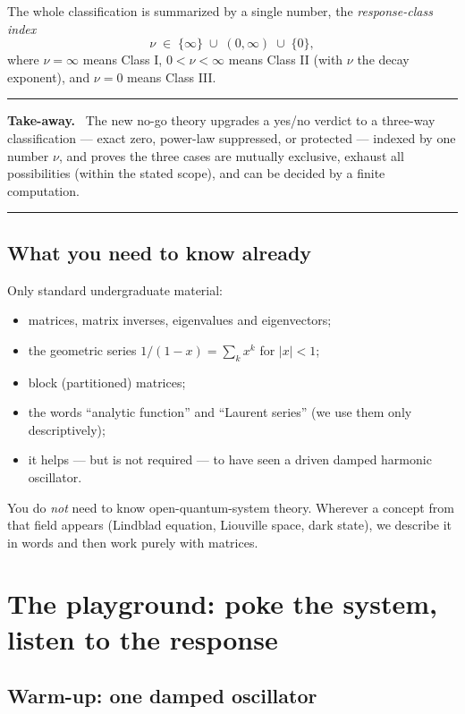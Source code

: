 \documentclass[11pt]{article}
\newenvironment{takeaway}
  {\par\medskip\noindent
   \begin{center}\begin{minipage}{0.92\textwidth}
   \hrule\medskip\noindent\textbf{Take-away.}\ }
  {\medskip\hrule\end{minipage}\end{center}\medskip}
\begin{document}
The whole classification is summarized by a single number, the
\emph{response-class index}
\[
\nu\;\in\;\{\infty\}\;\cup\;(0,\infty)\;\cup\;\{0\},
\]
where $\nu=\infty$ means Class I, $0<\nu<\infty$ means Class II
(with $\nu$ the decay exponent), and $\nu=0$ means Class III.

\begin{takeaway}
The new no-go theory upgrades a yes/no verdict to a three-way classification
--- exact zero, power-law suppressed, or protected --- indexed by one number
$\nu$, and proves the three cases are mutually exclusive, exhaust all
possibilities (within the stated scope), and can be decided by a finite
computation.
\end{takeaway}

\subsection{What you need to know already}

Only standard undergraduate material:
\begin{itemize}
\item matrices, matrix inverses, eigenvalues and eigenvectors;
\item the geometric series $1/(1-x)=\sum_k x^k$ for $|x|<1$;
\item block (partitioned) matrices;
\item the words ``analytic function'' and ``Laurent series'' (we use them
only descriptively);
\item it helps --- but is not required --- to have seen a driven damped
harmonic oscillator.
\end{itemize}
You do \emph{not} need to know open-quantum-system theory.  Wherever a
concept from that field appears (Lindblad equation, Liouville space, dark
state), we describe it in words and then work purely with matrices.

\section{The playground: poke the system, listen to the response}

\subsection{Warm-up: one damped oscillator}
\end{document}
